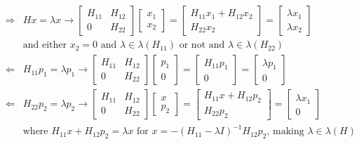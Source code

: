 \documentclass{article}
\begin{document}
\begin{align*}
    \Longrightarrow& Hx = \lambda x \longrightarrow \begin{bmatrix} H_{11} & H_{12} \\ 0 & H_{22} \end{bmatrix} \begin{bmatrix} x_1 \\ x_2 \end{bmatrix}
     = \begin{bmatrix} H_{11}x_1 + H_{12}x_2 \\ H_{22}x_2 \end{bmatrix} = \begin{bmatrix} \lambda x_1 \\ \lambda x_2 \end{bmatrix}\\
     &\textrm{and either $x_2=0$ and $\lambda \in \lambda(H_{11})$ or not and $\lambda \in \lambda(H_{22})$}\\
     \Longleftarrow& H_{11}p_1 = \lambda p_1 \longrightarrow \begin{bmatrix} H_{11} & H_{12} \\ 0 & H_{22} \end{bmatrix} \begin{bmatrix} p_1 \\ 0 \end{bmatrix}
     = \begin{bmatrix} H_{11}p_1 \\ 0 \end{bmatrix} = \begin{bmatrix} \lambda p_1 \\ 0 \end{bmatrix}\\
     \Longleftarrow& H_{22}p_2 = \lambda p_2 \longrightarrow \begin{bmatrix} H_{11} & H_{12} \\ 0 & H_{22} \end{bmatrix} \begin{bmatrix} x \\ p_2 \end{bmatrix}
     = \begin{bmatrix} H_{11}x + H_{12}p_2 \\ H_{22}p_2 \end{bmatrix} = \begin{bmatrix} \lambda x_1 \\ 0 \end{bmatrix}\\
     &\textrm{where } H_{11}x + H_{12}p_2 = \lambda x \textrm{ for } x = -(H_{11} - \lambda I)^{-1}H_{12}p_2 \textrm{, making } \lambda \in \lambda(H)
\end{align*}
\end{document}

